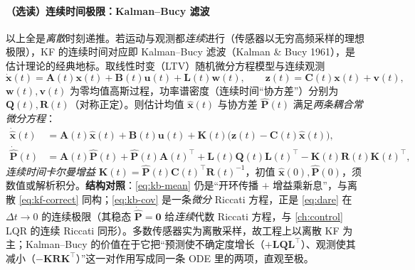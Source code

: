 \paragraph{（选读）连续时间极限：Kalman--Bucy 滤波}
以上全是\emph{离散}时刻递推。若运动与观测都\emph{连续}进行（传感器以无穷高频采样的理想极限），KF 的连续时间对应即 Kalman--Bucy 滤波（Kalman \& Bucy 1961），是估计理论的经典地标\cite{barfoot2024state}。取线性时变（LTV）随机微分方程模型与连续观测
\begin{equation}
  \dot{\mathbf{x}}(t)=\mathbf{A}(t)\mathbf{x}(t)+\mathbf{B}(t)\mathbf{u}(t)+\mathbf{L}(t)\mathbf{w}(t),\qquad
  \mathbf{z}(t)=\mathbf{C}(t)\mathbf{x}(t)+\mathbf{v}(t),
  \label{eq:kb-model}
\end{equation}
$\mathbf{w}(t),\mathbf{v}(t)$ 为零均值高斯过程，功率谱密度（连续时间“协方差”）分别为 $\mathbf{Q}(t),\mathbf{R}(t)$（对称正定）。则估计均值 $\hat{\mathbf{x}}(t)$ 与协方差 $\hat{\mathbf{P}}(t)$ 满足\emph{两条耦合常微分方程}\cite{barfoot2024state}：
\begin{align}
  \dot{\hat{\mathbf{x}}}(t)&=\mathbf{A}(t)\hat{\mathbf{x}}(t)+\mathbf{B}(t)\mathbf{u}(t)+\mathbf{K}(t)\big(\mathbf{z}(t)-\mathbf{C}(t)\hat{\mathbf{x}}(t)\big),
  \label{eq:kb-mean}\\
  \dot{\hat{\mathbf{P}}}(t)&=\mathbf{A}(t)\hat{\mathbf{P}}(t)+\hat{\mathbf{P}}(t)\mathbf{A}(t)^\top+\mathbf{L}(t)\mathbf{Q}(t)\mathbf{L}(t)^\top-\mathbf{K}(t)\mathbf{R}(t)\mathbf{K}(t)^\top,
  \label{eq:kb-cov}
\end{align}
\emph{连续时间卡尔曼增益} $\mathbf{K}(t)=\hat{\mathbf{P}}(t)\mathbf{C}(t)^\top\mathbf{R}(t)^{-1}$，初值 $\hat{\mathbf{x}}(0),\hat{\mathbf{P}}(0)$，须数值或解析积分。\textbf{结构对照}：\cref{eq:kb-mean} 仍是“开环传播 $+$ 增益乘新息”，与离散 \cref{eq:kf-correct} 同构；\cref{eq:kb-cov} 是一条\emph{微分} Riccati 方程，正是 \cref{eq:dare} 在 $\Delta t\to0$ 的连续极限（其稳态 $\dot{\hat{\mathbf{P}}}=\mathbf{0}$ 给\emph{连续}代数 Riccati 方程，与 \cref{ch:control} LQR 的连续 Riccati 同形）。多数传感器实为离散采样，故工程上以离散 KF 为主；Kalman--Bucy 的价值在于它把“预测使不确定度增长（$+\mathbf{L}\mathbf{Q}\mathbf{L}^\top$）、观测使其减小（$-\mathbf{K}\mathbf{R}\mathbf{K}^\top$）”这一对作用写成同一条 ODE 里的两项，直观至极。

